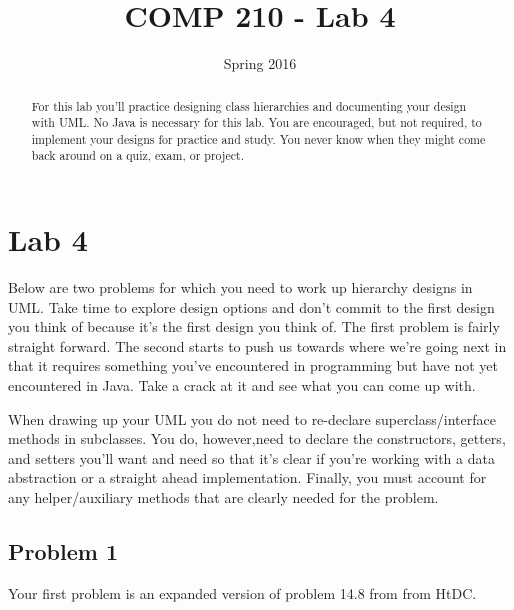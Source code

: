 \documentclass[]{tufte-handout}
\title{COMP 210 - Lab 4}
\date{Spring 2016}
\begin{document}
 
\maketitle

\begin{abstract}
For this lab you'll practice designing class hierarchies and documenting your design with UML. No Java is necessary for this lab. You are encouraged, but not required, to implement your designs for practice and study. You never know when they might come back around on a quiz, exam, or project. 
\end{abstract}




\section{Lab 4}

Below are two problems for which you need to work up hierarchy designs in UML. Take time to explore design options and don't commit to the first design you think of because it's the first design you think of.  The first problem is fairly straight forward. The second starts to push us towards where we're going next in that it requires something you've encountered in programming but have not yet encountered in Java. Take a crack at it and see what you can come up with.    

When drawing up your UML you do not need to re-declare superclass/interface methods in subclasses. You do, however,need to declare the constructors, getters, and setters you'll want and need so that it's clear if you're working with a data abstraction or a straight ahead implementation. Finally, you must account for any helper/auxiliary methods that are clearly needed for the problem. 

\subsection*{Problem 1}

Your first problem is an expanded version of problem 14.8 from from HtDC\citep{htdc}. 
\end{document}
